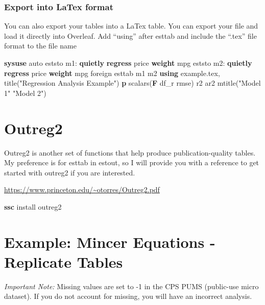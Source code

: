 \documentclass[
]{book}
\newenvironment{Shaded}{\begin{snugshade}}{\end{snugshade}}
\newcommand{\BaseNTok}[1]{\textcolor[rgb]{0.00,0.00,0.81}{#1}}
\newcommand{\FunctionTok}[1]{\textcolor[rgb]{0.13,0.29,0.53}{\textbf{#1}}}
\newcommand{\KeywordTok}[1]{\textcolor[rgb]{0.13,0.29,0.53}{\textbf{#1}}}
\newcommand{\NormalTok}[1]{#1}
\newcommand{\StringTok}[1]{\textcolor[rgb]{0.31,0.60,0.02}{#1}}
\begin{document}
\subsubsection{Export into LaTex format}\label{export-into-latex-format}

You can also export your tables into a LaTex table. You can export your file and load it directly into Overleaf.
Add ``using'' after esttab and include the ``.tex'' file format to the file name

\begin{Shaded}
\begin{Highlighting}[]
\KeywordTok{sysuse}\NormalTok{ auto}
\NormalTok{eststo m1: }\KeywordTok{quietly} \KeywordTok{regress}\NormalTok{ price }\KeywordTok{weight}\NormalTok{ mpg}
\NormalTok{eststo m2: }\KeywordTok{quietly} \KeywordTok{regress}\NormalTok{ price }\KeywordTok{weight}\NormalTok{ mpg foreign}
\NormalTok{esttab m1 m2 }\KeywordTok{using}\NormalTok{ example.tex, }\BaseNTok{title}\NormalTok{(}\StringTok{"Regression Analysis Example"}\NormalTok{) }\KeywordTok{p}\NormalTok{ scalars(}\FunctionTok{F}\NormalTok{ df\_r rmse) r2 ar2 mtitle(}\StringTok{"Model 1"} \StringTok{"Model 2"}\NormalTok{)}
\end{Highlighting}
\end{Shaded}

\section{Outreg2}\label{outreg2}

Outreg2 is another set of functions that help produce publication-quality tables. My preference is for esttab in estout, so I will provide you with a reference to get started with outreg2 if you are interested.

\url{https://www.princeton.edu/~otorres/Outreg2.pdf}

\begin{Shaded}
\begin{Highlighting}[]
\KeywordTok{ssc}\NormalTok{ install outreg2}
\end{Highlighting}
\end{Shaded}

\section{Example: Mincer Equations - Replicate Tables}\label{example-mincer-equations---replicate-tables}

\emph{Important Note:} Missing values are set to -1 in the CPS PUMS (public-use micro dataset). If you do not account for missing, you will have an incorrect analysis.
\end{document}

